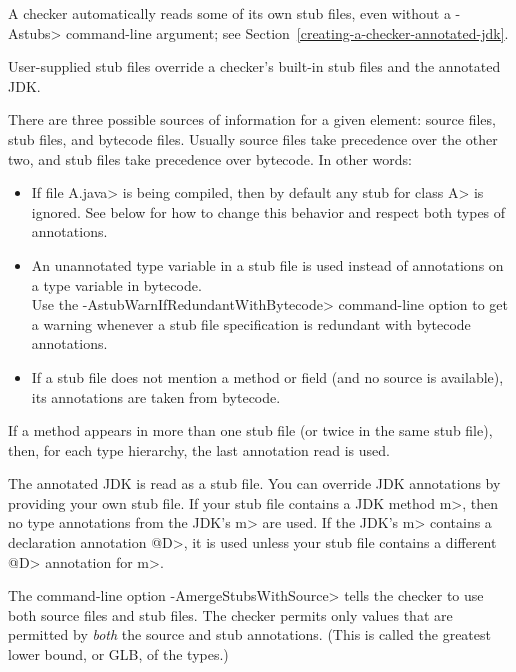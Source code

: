 A checker automatically reads some of its own stub files, even without a
\<-Astubs> command-line argument; see
Section~\ref{creating-a-checker-annotated-jdk}.

User-supplied stub files override a checker's built-in stub files and the
annotated JDK\@.



There are three possible sources of information for a given
element: source files, stub files, and bytecode files.
Usually source files take precedence over the other two,
and stub files take precedence over bytecode.
In other words:
\begin{itemize}
\item
  If file \<A.java> is being compiled, then by default any stub for class
  \<A> is ignored.  See below for how to change this behavior and respect
  both types of annotations.
\item
  An unannotated type variable in a stub file is used instead of
  annotations on a type variable in bytecode.
  \\
  Use the \<-AstubWarnIfRedundantWithBytecode> command-line option to get a
  warning whenever a stub file specification is redundant with bytecode
  annotations.
\item
  If a stub file does not mention a method or field (and no source is
  available), its annotations are taken from bytecode.
\end{itemize}

If a method appears in more than one stub file (or twice in the same
stub file), then, for each type hierarchy, the last annotation read is used.

The annotated JDK is read as a stub file.
You can override JDK annotations by providing your own stub file.
If your stub file contains a JDK method \<m>, then no type annotations from
the JDK's \<m> are used.  If the JDK's \<m> contains a declaration
annotation \<@D>, it is used unless your stub file contains a different
\<@D> annotation for \<m>.

The command-line option \<-AmergeStubsWithSource> tells the checker to use
both source files and stub files.  The checker permits only values that are
permitted by \emph{both} the source and stub annotations.  (This is called
the greatest lower bound, or GLB, of the types.)

